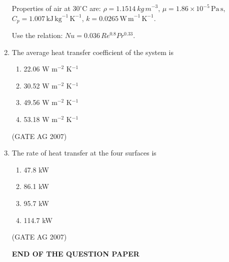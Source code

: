 \documentclass[journal,12pt,onecolumn]{IEEEtran}
\theoremstyle{remark}
\begin{document}
\begin{enumerate}[label=Q\arabic*:]
Properties of air at $30^\circ$C are: $\rho = 1.1514\mathrm\ {kg\,m}^{-3}$, $\mu = 1.86\times 10^{-5}\,\mathrm{Pa\,s}$, $C_p = 1.007\,\mathrm{kJ\,kg}^{-1}\,\mathrm{K}^{-1}$, $k = 0.0265\,\mathrm{W\,m}^{-1}\,\mathrm{K}^{-1}$.

Use the relation: $Nu = 0.036\,Re^{0.8} Pr^{0.33}$.


\item The average heat transfer coefficient of the system is
\begin{multicols}{4}
\begin{enumerate}
\item 22.06 W m$^{-2}$ K$^{-1}$
\item 30.52 W m$^{-2}$ K$^{-1}$
\item 49.56 W m$^{-2}$ K$^{-1}$
\item 53.18 W m$^{-2}$ K$^{-1}$
\end{enumerate}
\end{multicols}
\hfill(GATE AG 2007)


\item The rate of heat transfer at the four surfaces is

\begin{multicols}{4}
\begin{enumerate}
\item 47.8 kW
\item 86.1 kW
\item 95.7 kW
\item 114.7 kW
\end{enumerate}
\end{multicols}
\hfill(GATE AG 2007)



\begin{center}
\textbf{END OF THE QUESTION PAPER}
\end{center}

\end{enumerate}
\end{document}

